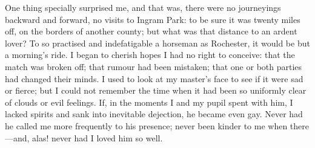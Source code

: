 One thing specially surprised me, and that was, there were no
journeyings backward and forward, no visits to Ingram Park: to be sure
it was twenty miles off, on the borders of another county; but what was
that distance to an ardent lover? To so practised and indefatigable a
horseman as \Mr{} Rochester, it would be but a morning's ride. I began to
cherish hopes I had no right to conceive: that the match was broken off;
that rumour had been mistaken; that one or both parties had changed
their minds. I used to look at my master's face to see if it were sad
or fierce; but I could not remember the time when it had been so
uniformly clear of clouds or evil feelings. If, in the moments I and my
pupil spent with him, I lacked spirits and sank into inevitable
dejection, he became even gay. Never had he called me more frequently
to his presence; never been kinder to me when there---and, alas! never
had I loved him so well.
